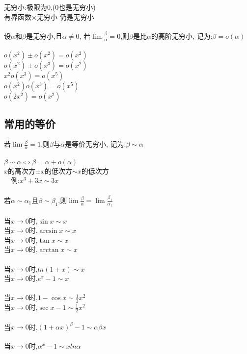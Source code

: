 \documentclass{article}
\begin{document}
\begin{flushleft}
	无穷小:极限为0,(0也是无穷小)\\
	有界函数$\times$无穷小 仍是无穷小\\
	~\\
	设$\alpha$和$\beta$是无穷小,且$\alpha \neq 0$,
	若$\lim \frac{\beta}{\alpha}=0$,则$\beta$是比$\alpha$的高阶无穷小,
	记为:$\beta = o(\alpha)$\\
	~\\
	$o(x^2)\pm o(x^2)=o(x^2)$\\
	$o(x^2)\pm o(x^3)=o(x^2)$\\
	$x^2 o(x^3)=o(x^5)$\\
	$o(x^2) o(x^3)=o(x^5)$\\
	$o(2x^2)=o(x^2)$\\
	
	\subsection{常用的等价}
	
	若$\lim \frac{\beta}{\alpha}=1$,则$\beta$与$\alpha$是等价无穷小,
	记为:$\beta \sim \alpha$\\
	~\\
	$\beta \sim \alpha \Leftrightarrow \beta = \alpha + o(\alpha)$\\
	$x$的高次方$\pm x$的低次方$\sim x$的低次方\\
	\ \ 例:$x^3+3x\sim 3x$\\
	~\\
	若$\alpha \sim \alpha_1$且$\beta \sim \beta_1$,则$\lim \frac{\beta}{\alpha} = \lim \frac{\beta_1}{\alpha_1}$\\
	~\\
	当$x\to 0$时,$\sin x \sim x$\\
	当$x\to 0$时,$\arcsin x \sim x$\\
	当$x\to 0$时,$\tan x \sim x$\\
	当$x\to 0$时,$\arctan x \sim x$\\
	~\\
	当$x\to 0$时,$ln(1+x) \sim x$\\
	当$x\to 0$时,$e^x-1 \sim x$\\
	~\\
	当$x\to 0$时,$1-\cos x \sim \frac{1}{2} x^2$\\
	当$x\to 0$时,$\sec x - 1 \sim \frac{1}{2} x^2$\\
	~\\
	当$x\to 0$时,$(1+\alpha x)^\beta -1 \sim \alpha\beta x$\\
	~\\
	当$x\to 0$时,$\alpha^x -1 \sim xln\alpha$\\
	

\end{flushleft}
\end{document}
